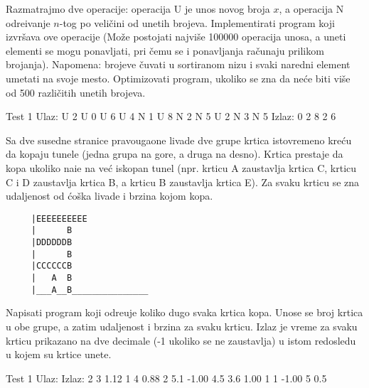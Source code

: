 \begin{Exercise}[label=510]
  Razmatrajmo dve operacije: operacija U je unos novog broja $x$, a
  operacija N odre\dj ivanje $n$-tog po veli\v cini od unetih
  brojeva. Implementirati program koji izvr\v sava ove operacije (Mo\v
  ze postojati najvi\v se 100000 operacija unosa, a uneti elementi se
  mogu ponavljati, pri \v cemu se i ponavljanja ra\v cunaju prilikom
  brojanja). Napomena: brojeve \v cuvati u sortiranom nizu i svaki
  naredni element umetati na svoje mesto. Optimizovati program,
  ukoliko se zna da ne\' ce biti vi\v se od 500 razli\v citih unetih
  brojeva.
  
  \begin{maxitest}
    \begin{test}{Test 1}
Ulaz: U 2 U 0 U 6 U 4 N 1 U 8 N 2 N 5 U 2 N 3 N 5
Izlaz: 0 2 8 2 6
    \end{test}
  \end{maxitest}
  
\end{Exercise}

\begin{Exercise}[label=511]
  Sa dve susedne stranice pravougaone livade dve grupe krtica
  istovremeno kre\' cu da kopaju tunele (jedna grupa na gore, a
  druga na desno). Krtica prestaje da kopa ukoliko nai\dj e na ve\'
  c iskopan tunel (npr. krticu A zaustavlja krtica C, krticu C i D
  zaustavlja krtica B, a krticu B zaustavlja krtica E). Za svaku
  krticu se zna udaljenost od \' co\v ska livade i brzina kojom
  kopa.
\begin{verbatim}
     |EEEEEEEEEE
     |      B
     |DDDDDDB 
     |      B
     |CCCCCCB
     |   A  B
     |___A__B_______________
\end{verbatim}
Napisati program koji odre\dj uje koliko dugo svaka krtica kopa. Unose
se broj krtica u obe grupe, a zatim udaljenost i brzina za svaku
krticu. Izlaz je vreme za svaku krticu prikazano na dve decimale (-1
ukoliko se ne zaustavlja) u istom redosledu u kojem su krtice unete.

  \begin{miditest}
    \begin{test}{Test 1}
      Ulaz:          Izlaz:
      2 3            1.12
      1   4          0.88
      2   5.1        -1.00
      4.5 3.6        1.00
      1   1          -1.00
      5   0.5
    \end{test}
  \end{miditest}
  
\end{Exercise}

